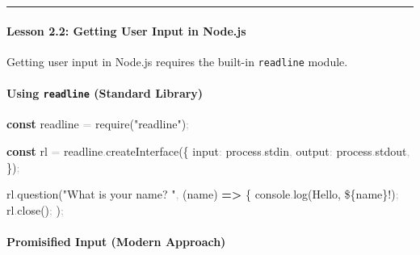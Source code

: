 \documentclass[
  justified,
  openright,
]{tufte-book}
\let\subsection\paragraph
\let\paragraph\paragraph
\newcommand{\KeywordTok}[1]{\textcolor{CodeKeyword}{\textbf{#1}}}  %
\newcommand{\StringTok}[1]{\textcolor{CodeString}{#1}}              %
\newcommand{\CodeFuncTok}[1]{\textcolor{CodeKeyword}{#1}}           %
\newcommand{\CodeTypeTok}[1]{\textcolor{CodeType}{#1}}              %
\newcommand{\CodeAccentTok}[1]{\textcolor{CodeAccent}{#1}}          %
\newcommand{\OperatorTok}[1]{\textcolor{DarkGray}{#1}}              %
\newenvironment{Shaded}{%
  \begin{mdframed}[style=TufteCode]%
}{%
  \end{mdframed}%
}
\let\subsection\paragraph
\let\paragraph\paragraph
\begin{document}
\begin{center}\rule{0.5\linewidth}{0.5pt}\end{center}

\subsection{Lesson 2.2: Getting User Input in
Node.js}\label{lesson-2.2-getting-user-input-in-node.js}

Getting user input in Node.js requires the built-in \texttt{readline}
module.

\subsection{\texorpdfstring{Using \texttt{readline} (Standard
Library)}{Using readline (Standard Library)}}\label{using-readline-standard-library}

\begin{Shaded}
\begin{Highlighting}[]
\KeywordTok{const} readline \OperatorTok{=} \CodeAccentTok{require}(\StringTok{"readline"})\OperatorTok{;}
 
\KeywordTok{const} rl \OperatorTok{=} readline\OperatorTok{.}\CodeFuncTok{createInterface}(\{
  \CodeTypeTok{input}\OperatorTok{:} process\OperatorTok{.}\CodeTypeTok{stdin}\OperatorTok{,}
  \CodeTypeTok{output}\OperatorTok{:} process\OperatorTok{.}\CodeTypeTok{stdout}\OperatorTok{,}
\})\OperatorTok{;}
 
rl\OperatorTok{.}\CodeFuncTok{question}(\StringTok{"What is your name? "}\OperatorTok{,} (name) \KeywordTok{=\textgreater{}} \{
  console\OperatorTok{.}\CodeFuncTok{log}(\StringTok{\textasciigrave{}Hello, }\StringTok{\$\{}name\StringTok{\}}\StringTok{!\textasciigrave{}})\OperatorTok{;}
  rl\OperatorTok{.}\CodeFuncTok{close}()\OperatorTok{;}
)\OperatorTok{;}
\end{Highlighting}
\end{Shaded}

\subsection{Promisified Input (Modern
Approach)}\label{promisified-input-modern-approach}
\end{document}
